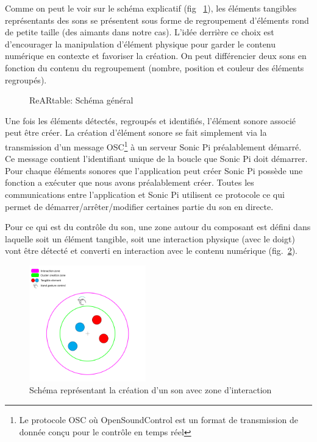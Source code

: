 Comme on peut le voir sur le schéma explicatif (fig ~\ref{fig:reartable:generalscheme}), les éléments tangibles représentants des sons se présentent sous forme de regroupement d'éléments rond de petite taille (des aimants dans notre cas). L'idée derrière ce choix est d'encourager la manipulation d'élément physique pour garder le contenu numérique en contexte et favoriser la création. On peut différencier deux sons en fonction du contenu du regroupement (nombre, position et couleur des éléments regroupés).

\begin{figure}[H]
\centering
\caption{ReARtable: Schéma général}
\label{fig:reartable:generalscheme}
\end{figure}

Une fois les éléments détectés, regroupés et identifiés, l'élément sonore associé peut être créer. La création d'élément sonore se fait simplement via la transmission d'un message OSC\footnote{Le protocole OSC où OpenSoundControl est un format de transmission de donnée conçu pour le contrôle en temps réel} à un serveur Sonic Pi préalablement démarré. Ce message contient l'identifiant unique de la boucle que Sonic Pi doit démarrer. Pour chaque éléments sonores que l'application peut créer Sonic Pi possède une fonction a exécuter que nous avons préalablement créer. Toutes les communications entre l'application et Sonic Pi utilisent ce protocole ce qui permet de démarrer/arrêter/modifier certaines partie du son en directe.

Pour ce qui est du contrôle du son, une zone autour du composant est défini dans laquelle soit un élément tangible, soit une interaction physique (avec le doigt) vont être détecté et converti en interaction avec le contenu numérique (fig.~\ref{fig:reartable:interactionzone}).

\begin{figure}[H]
\centering
\includegraphics[width=0.45\textwidth]{images/reartable_cluster_interaction}
\caption{Schéma représentant la création d'un son avec zone d'interaction}
\label{fig:reartable:interactionzone}
\end{figure}

